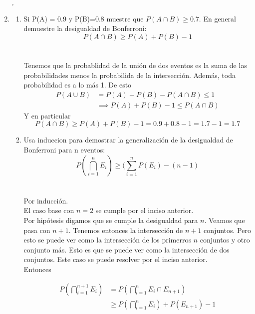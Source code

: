 \documentclass[12pt,a4paper]{report}
\begin{document}
\begin{enumerate}
{\begin{enumerate}[label=\Roman*.]
{		\begin{flushright}
			$_{\square}$
		\end{flushright}
	}
	\end{enumerate}


	}

   \item {
  	\begin{enumerate}[label=\alph*) ]
   \item {
	Si P(A) = 0.9 y P(B)=0.8 muestre que $P(A \cap B) \geq 0.7$. En general demuestre la desigualdad de Bonferroni:\\
	$$P(A \cap B) \geq P(A)+P(B) -1$$\\\\

	Tenemos que la probablidad de la unión de dos eventos es la suma de las
	probabilidades menos la probabilida de la intersección. Además, toda probabilidad
	es a lo más 1. De esto
	\begin{align*}
		P(A \cup B) &= P(A) + P(B) - P(A \cap B) \leq 1\\
								&\implies P(A) + P(B) - 1 \leq P(A \cap B)
	\end{align*}
	Y en particular
	\begin{equation*}
		P(A \cap B) \geq P(A) + P(B) - 1 = 0.9 + 0.8 - 1 = 1.7 - 1 = 1.7
	\end{equation*}

   }

   \item {
 	Usa induccion para demostrar la generalización de la desigualdad de Bonferroni para n eventos:\\
 	$$P(\bigcap\limits_{i=1}^{n} E_{i}) \geq (\sum_{i=1}^{n} P(E_{i})-(n-1)$$\\\\

 	Por inducción.	\\
	El caso base con $n = 2$ se cumple por el inciso anterior.\\
 	Por hipótesis digamos que se cumple la desigualdad para $n$.
	Veamos que pasa con $n+1$.
	Tenemos entonces la intersección de $n+1$ conjuntos. Pero esto se puede ver
	como la intersección de los primerros $n$ conjuntos y otro conjunto más.
	Esto es que se puede ver como la intersección de dos conjuntos. Este caso se
	puede resolver por el inciso anterior.\\
	Entonces

	\begin{align*}
		P(\bigcap\limits_{i=1}^{n+1} E_{i}) &= P(\bigcap\limits_{i=1}^{n} E_{i} \cap E_{n+1})\\
																				&\geq P(\bigcap\limits_{i=1}^{n} E_{i}) + P(E_{n+1}) - 1
	\end{align*}



}
\end{enumerate}}
\end{enumerate}
\end{document}
